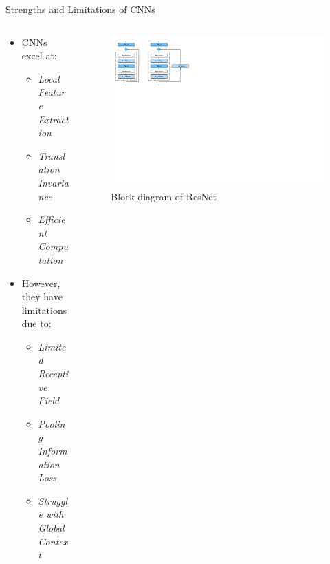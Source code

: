 \begin{frame}{Strengths and Limitations of CNNs}
    \begin{columns}
        \begin{column}{0.55\linewidth}
            \begin{itemize}
                \item CNNs excel at:
                \begin{itemize}
                    \item \emph{Local Feature Extraction} 
                    \item \emph{Translation Invariance} 
                    \item \emph{Efficient Computation} 
                \end{itemize}
                \item However, they have limitations due to:
                \begin{itemize}
                    \item \emph{Limited Receptive Field} 
                    \item \emph{Pooling Information Loss} 
                    \item \emph{Struggle with Global Context} 
                \end{itemize}
            \end{itemize}
        \end{column}
        \begin{column}{0.45\linewidth}
            \begin{figure}
                \centering
                \includegraphics[width=\linewidth]{pic/ResNet_block.pdf}
                \caption{Block diagram of ResNet}
                \label{fig:resnet}
            \end{figure}
        \end{column}
    \end{columns}
\end{frame}




